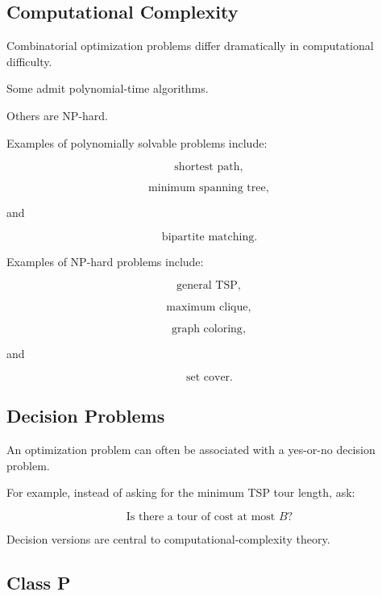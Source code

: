 \subsection{Computational Complexity}
\label{subsec:combinatorial-complexity}

Combinatorial optimization problems differ dramatically in computational
difficulty.

Some admit polynomial-time algorithms.

Others are NP-hard.

Examples of polynomially solvable problems include:

\[
\boxed{
\text{shortest path},
}
\]

\[
\boxed{
\text{minimum spanning tree},
}
\]

and

\[
\boxed{
\text{bipartite matching}.
}
\]

Examples of NP-hard problems include:

\[
\boxed{
\text{general TSP},
}
\]

\[
\boxed{
\text{maximum clique},
}
\]

\[
\boxed{
\text{graph coloring},
}
\]

and

\[
\boxed{
\text{set cover}.
}
\]

\subsection{Decision Problems}
\label{subsec:decision-problems-combinatorial}

An optimization problem can often be associated with a yes-or-no decision
problem.

For example, instead of asking for the minimum TSP tour length, ask:

\[
\boxed{
\text{Is there a tour of cost at most }B?
}
\]

Decision versions are central to computational-complexity theory.

\subsection{Class P}
\label{subsec:class-p-combinatorial}

